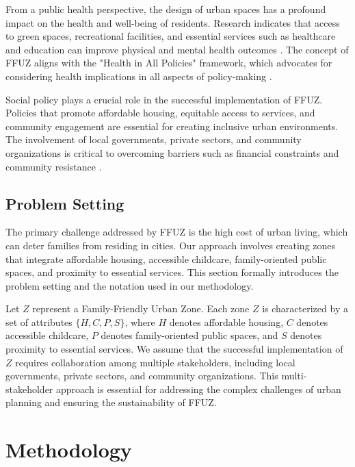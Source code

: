 \documentclass{article} %
\begin{document}
From a public health perspective, the design of urban spaces has a profound impact on the health and well-being of residents. Research indicates that access to green spaces, recreational facilities, and essential services such as healthcare and education can improve physical and mental health outcomes \citep{west2023agent, zhou2023peer}. The concept of FFUZ aligns with the "Health in All Policies" framework, which advocates for considering health implications in all aspects of policy-making \citep{liu2023agentbench}.

Social policy plays a crucial role in the successful implementation of FFUZ. Policies that promote affordable housing, equitable access to services, and community engagement are essential for creating inclusive urban environments. The involvement of local governments, private sectors, and community organizations is critical to overcoming barriers such as financial constraints and community resistance \citep{poledna2023economic}.

\subsection{Problem Setting}
\label{sec:problem_setting}

The primary challenge addressed by FFUZ is the high cost of urban living, which can deter families from residing in cities. Our approach involves creating zones that integrate affordable housing, accessible childcare, family-oriented public spaces, and proximity to essential services. This section formally introduces the problem setting and the notation used in our methodology.

Let \( Z \) represent a Family-Friendly Urban Zone. Each zone \( Z \) is characterized by a set of attributes \(\{H, C, P, S\}\), where \( H \) denotes affordable housing, \( C \) denotes accessible childcare, \( P \) denotes family-oriented public spaces, and \( S \) denotes proximity to essential services. We assume that the successful implementation of \( Z \) requires collaboration among multiple stakeholders, including local governments, private sectors, and community organizations. This multi-stakeholder approach is essential for addressing the complex challenges of urban planning and ensuring the sustainability of FFUZ.

\section{Methodology}
\label{sec:method}
\end{document}
